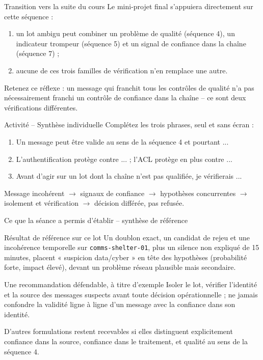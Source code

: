 \documentclass[aspectratio=169]{beamer}
\begin{document}
\begin{frame}{Transition vers la suite du cours}
  Le mini-projet final s'appuiera directement sur cette séquence :
  \begin{enumerate}
    \item un lot ambigu peut combiner un problème de qualité (séquence 4), un indicateur trompeur (séquence 5) et un signal de confiance dans la chaîne (séquence 7) ;
    \item aucune de ces trois familles de vérification n'en remplace une autre.
  \end{enumerate}
  \vfill
  Retenez ce réflexe : un message qui franchit tous les contrôles de qualité n'a pas nécessairement franchi un contrôle de confiance dans la chaîne -- ce sont deux vérifications différentes.
\end{frame}

\begin{frame}{Activité -- Synthèse individuelle}
  Complétez les trois phrases, seul et sans écran :
  \begin{enumerate}
    \item Un message peut être valide au sens de la séquence 4 et pourtant ...
    \item L'authentification protège contre ... ; l'ACL protège en plus contre ...
    \item Avant d'agir sur un lot dont la chaîne n'est pas qualifiée, je vérifierais ...
  \end{enumerate}
  \vfill
  \alert{Message incohérent $\rightarrow$ signaux de confiance $\rightarrow$ hypothèses concurrentes $\rightarrow$ isolement et vérification $\rightarrow$ décision différée, pas refusée.}
\end{frame}

\begin{frame}{Ce que la séance a permis d'établir -- synthèse de référence}
  \small
  \begin{block}{Résultat de référence sur ce lot}
    Un doublon exact, un candidat de rejeu et une incohérence temporelle sur \texttt{comms-shelter-01}, plus un silence non expliqué de 15 minutes, placent « suspicion data/cyber » en tête des hypothèses (probabilité forte, impact élevé), devant un problème réseau plausible mais secondaire.
  \end{block}
  \begin{block}{Une recommandation défendable, à titre d'exemple}
    Isoler le lot, vérifier l'identité et la source des messages suspects avant toute décision opérationnelle ; ne jamais confondre la validité ligne à ligne d'un message avec la confiance dans son identité.
  \end{block}
  \normalsize
  \alert{D'autres formulations restent recevables si elles distinguent explicitement confiance dans la source, confiance dans le traitement, et qualité au sens de la séquence 4.}
\end{frame}
\end{document}

